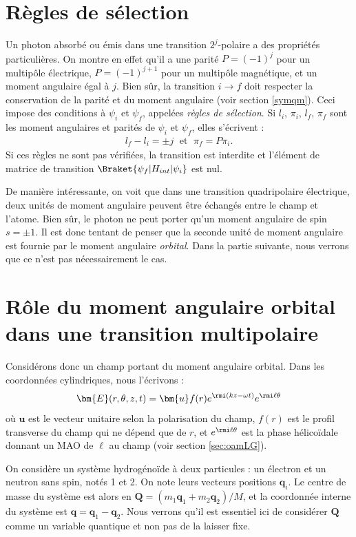 \section{Règles de sélection}
Un photon absorbé ou émis dans une transition $2^j$-polaire a des propriétés particulières. On montre en effet  qu'il a une parité $P=(-1)^j$ pour un multipôle électrique, $P=(-1)^{j+1}$ pour un multipôle magnétique, et un moment angulaire égal à $j$. Bien sûr, la transition $i\rightarrow f$ doit respecter la conservation de la parité et du moment angulaire (voir section \ref{symqm}). Ceci impose des conditions à $\psi_i$ et $\psi_f$, appelées \textit{règles de sélection}. Si $l_i$, $\pi_i$, $l_f$, $\pi_f$ sont les moment angulaires et parités de $\psi_i$ et $\psi_f$, elles s'écrivent :
\begin{align*}
l_f-l_i=\pm j\;\text{ et }\;\pi_f=P\pi_i.
\end{align*}
Si ces règles ne sont pas vérifiées, la transition est interdite et l'élément de matrice de transition $\Braket{\psi_f|H_{int}|\psi_i}$ est nul.

De manière intéressante, on voit que dans une transition quadripolaire électrique, deux unités de moment angulaire peuvent être échangés entre le champ et l'atome. Bien sûr, le photon ne peut porter qu'un moment angulaire de spin $s=\pm 1$. Il est donc tentant de penser que la seconde unité de moment angulaire est fournie par le moment angulaire \textit{orbital}. Dans la partie suivante, nous verrons que ce n'est pas nécessairement le cas.

\section{Rôle du moment angulaire orbital dans une transition multipolaire}
Considérons donc un champ portant du moment angulaire orbital. Dans les coordonnées cylindriques, nous l'écrivons :
\[\bm{E}(r,\theta,z,t) = \bm{u} f(r)e^{\rmi(kz-\omega t)}e^{\rmi\ell\theta}\]
où $\bm{u}$ est le vecteur unitaire selon la polarisation du champ, $f(r)$ est le profil transverse du champ qui ne dépend que de $r$, et $e^{\rmi\ell\theta}$ est la phase hélicoïdale donnant un MAO de $\ell$ au champ (voir section \ref{sec:oamLG}).

On considère un système hydrogénoïde à deux particules : un électron et un neutron sans spin, notés 1 et 2. On note leurs vecteurs positions $\bm{q}_i$. Le centre de masse du système est alors en $\bm{Q} = (m_1 \bm{q}_1+m_2 \bm{q}_2)/M$, et la coordonnée interne du système est $\bm{q} = \bm{q}_1-\bm{q}_2$. Nous verrons qu'il est essentiel ici de considérer $\bm{Q}$ comme un variable quantique et non pas de la laisser fixe.

